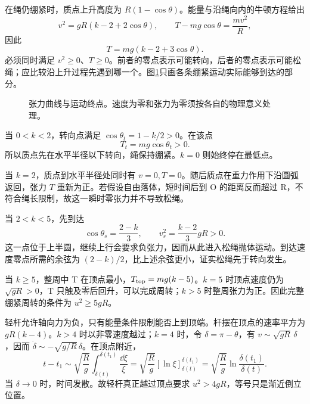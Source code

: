 \begin{solution}
在绳仍绷紧时，质点上升高度为 $R(1-\cos\theta)$。能量与沿绳向内的牛顿方程给出
\[
v^2=gR(k-2+2\cos\theta),\qquad
T-mg\cos\theta=\frac{mv^2}{R},
\]
因此
\[
T=mg(k-2+3\cos\theta).
\]
必须同时满足 $v^2\ge0$、$T\ge0$。前者的零点表示可能转向，后者的零点表示可能松绳；应比较沿上升过程先遇到哪一个。图\ref{sup2:fig:d2-e3-s}只画各条绷紧运动实际能够到达的部分。

\begin{figure}[H]\centering
{}
\caption{张力曲线与运动终点。速度为零和张力为零须按各自的物理意义处理。}\label{sup2:fig:d2-e3-s}
\end{figure}

当 $0<k<2$，转向点满足 $\cos\theta_t=1-k/2>0$。在该点
\[
T_t=mg\cos\theta_t>0.
\]
所以质点先在水平半径以下转向，绳保持绷紧。$k=0$ 则始终停在最低点。

当 $k=2$，质点到水平半径处同时有 $v=0,T=0$。随后质点在重力作用下沿圆弧返回，张力 $T$ 重新为正。若假设自由落体，短时间后到 O 的距离反而超过 R，不符合绳长限制，故这一瞬时零张力并不导致松绳。

当 $2<k<5$，先到达
\[
\cos\theta_s=\frac{2-k}{3},\qquad
v_s^2=\frac{k-2}{3}gR>0.
\]
这一点位于上半圆，继续上行会要求负张力，因而从此进入松绳抛体运动。到达速度零点所需的余弦为 $(2-k)/2$，比上述余弦更小，证实松绳先于转向发生。

当 $k\ge5$，整周中 T 在顶点最小，$T_{\rm top}=mg(k-5)$。$k=5$ 时顶点速度仍为 $\sqrt{gR}>0$，T 只触及零后回升，可以完成周转；$k>5$ 时整周张力为正。因此完整绷紧周转的条件为 $u^2\ge5gR$。

轻杆允许轴向力为负，只有能量条件限制能否上到顶端。杆摆在顶点的速率平方为 $gR(k-4)$。$k>4$ 时以非零速度越过；$k=4$ 时，令 $\delta=\pi-\theta$，有 $v\sim\sqrt{gR}\,\delta$，因而 $\dot\delta\sim-\sqrt{g/R}\,\delta$。在顶点附近，
\[
t-t_1\sim\sqrt{\frac Rg}\int_{\delta(t)}^{\delta(t_1)}\frac{\dd\xi}{\xi}
=\sqrt{\frac Rg}[\ln\xi]_{\delta(t)}^{\delta(t_1)}
=\sqrt{\frac Rg}\ln\frac{\delta(t_1)}{\delta(t)}.
\]
当 $\delta\to0$ 时，时间发散。故轻杆真正越过顶点要求 $u^2>4gR$，等号只是渐近倒立位置。

\end{solution}



